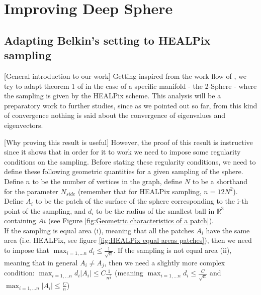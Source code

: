 

\section{Improving Deep Sphere}

\subsection{Adapting Belkin's setting to HEALPix sampling}

[General introduction to our work] Getting inspired from the work flow of \cite{Belkin:2005:TTF:2138147.2138189, vonluxburg2008, NIPS2006_2989}, we try to adapt theorem 1 of \cite{Belkin:2005:TTF:2138147.2138189} in the case of a specific manifold - the 2-Sphere - where the sampling is given by the HEALPix scheme. This analysis will be a preparatory work to further studies, since as we pointed out so far, from this kind of convergence nothing is said about the convergence of eigenvalues and eigenvectors. 

[Why proving this result is useful] However, the proof of this result is instructive since it shows that in order for it to work we need to impose some regularity conditions on the sampling. Before stating these regularity conditions, we need to define these following geometric quantities for a given sampling of the sphere. Define $n$ to be the number of vertices in the graph, define $N$ to be a shorthand for the parameter $N_{side}$ (remember that for HEALPix sampling, $n=12N^2$). Define $A_i$ to be the patch of the surface of the sphere corresponding to the i-th point of the sampling, and $d_i$ to be the radius of the smallest ball in $\mathbb R^3$ containing $Ai$ (see Figure \ref{fig:Geometric characteristics of a patch}). \\
If the sampling is equal area (i), meaning that all the patches $A_i$ have the same area (i.e. HEALPix, see figure \ref{fig:HEALPix equal areas patches}), then we need to impose that $ \max_{i=1,...n} d_i \leq \frac{1}{\sqrt{n}}$. If the sampling is not equal area (ii), meaning that in general $A_i\neq A_j$, then we need a slightly more complex condition: $\max_{i=1,...n}d_i|A_i|\leq C\frac{1}{n^\frac{3}{2}}$ (meaning $\max_{i=1,...n} d_i \leq \frac{C}{\sqrt{n}}$ and $\max_{i=1,...n} |A_i| \leq \frac{C}{n}$)\\

